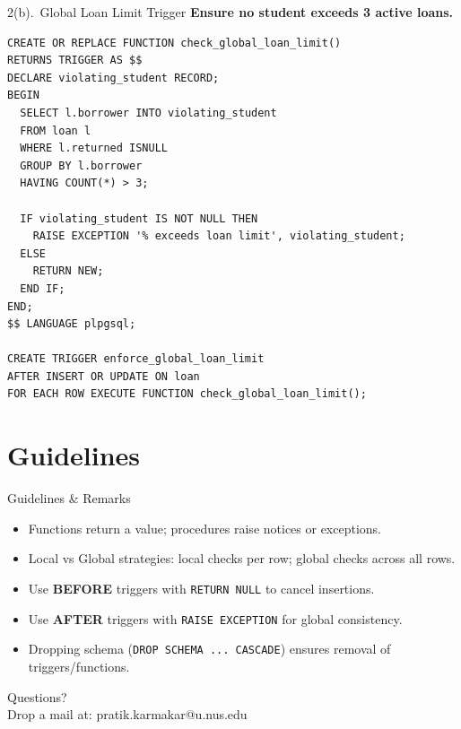 \documentclass{beamer}
\begin{document}
\begin{frame}[fragile]{2(b).\ Global Loan Limit Trigger}
\textbf{Ensure no student exceeds 3 active loans.}
\begin{lstlisting}
CREATE OR REPLACE FUNCTION check_global_loan_limit()
RETURNS TRIGGER AS $$
DECLARE violating_student RECORD;
BEGIN
  SELECT l.borrower INTO violating_student
  FROM loan l
  WHERE l.returned ISNULL
  GROUP BY l.borrower
  HAVING COUNT(*) > 3;

  IF violating_student IS NOT NULL THEN
    RAISE EXCEPTION '% exceeds loan limit', violating_student;
  ELSE
    RETURN NEW;
  END IF;
END;
$$ LANGUAGE plpgsql;

CREATE TRIGGER enforce_global_loan_limit
AFTER INSERT OR UPDATE ON loan
FOR EACH ROW EXECUTE FUNCTION check_global_loan_limit();
\end{lstlisting}
\end{frame}

\section{Guidelines}
\begin{frame}{Guidelines \& Remarks}
\small
\begin{itemize}\itemsep4pt
  \item Functions return a value; procedures raise notices or exceptions.
  \item Local vs Global strategies: local checks per row; global checks across all rows.
  \item Use \textbf{BEFORE} triggers with \texttt{RETURN NULL} to cancel insertions.
  \item Use \textbf{AFTER} triggers with \texttt{RAISE EXCEPTION} for global consistency.
  \item Dropping schema (\texttt{DROP SCHEMA ... CASCADE}) ensures removal of triggers/functions.
\end{itemize}
\end{frame}

\begin{frame}
\begin{center}
Questions?\\
Drop a mail at: pratik.karmakar@u.nus.edu
\end{center}
\end{frame}
\end{document}
